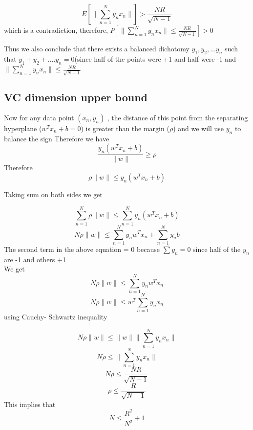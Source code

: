\documentclass{article}
\begin{document}
$$
E[\|\sum_{n=1}^{N}y_nx_n\|] > \frac{NR}{\sqrt{N-1}}
$$
which is a contradiction, therefore, $P[\|\sum_{n=1}^{N}y_nx_n\| \leq \frac{NR}{\sqrt{N-1}}]>0$

Thus we also conclude that there exists a balanced dichotomy $y_1,y_2, ... y_n$ such that $y_1 + y_2 + .... y_n = 0 $(since half of the points were +1 and half were -1 and $\|\sum_{n=1}^{N}y_nx_n\| \leq \frac{NR}{\sqrt{N-1}}$
\subsection{VC dimension upper bound }

Now for any data point $(x_n, y_n)$ , the distance of this point from the separating hyperplane ($w^Tx_n + b =0 $) is greater than the margin ($\rho$) and we will use $y_n$ to balance the sign 
Therefore we have 
$$\frac{y_n(w^Tx_n+b)}{\|w\|} \ge \rho$$
Therefore 
$$ \rho\|w\|\le y_n(w^Tx_n+b)$$

Taking sum on both sides we get 

$$ \sum_{n=1}^{N}\rho\|w\|\le\sum_{n=1}^{N} y_n(w^Tx_n+b)$$
$$ N\rho\|w\|\le\sum_{n=1}^{N} y_nw^Tx_n+\sum_{n=1}^{N} y_nb$$
The second term in the above equation = 0 because $\sum y_n= 0 $ since half of the $y_n $ are -1 and others +1 \\
We get 
$$ N\rho\|w\|\le\sum_{n=1}^{N} y_nw^Tx_n$$
$$ N\rho\|w\|\le w^T \sum_{n=1}^{N} y_nx_n$$
using Cauchy- Schwartz inequality

$$ N\rho\|w\|\le \|w\| \| \sum_{n=1}^{N}y_nx_n\|$$
$$ N\rho\le \| \sum_{n=1}^{N} y_nx_n\|$$
$$ N\rho\le \frac{NR}{\sqrt{N-1}}$$
$$ \rho\le \frac{R}{\sqrt{N-1}}$$
This implies that 
$$N \le\frac{R^2}{N^2}+1$$
\end{document}
